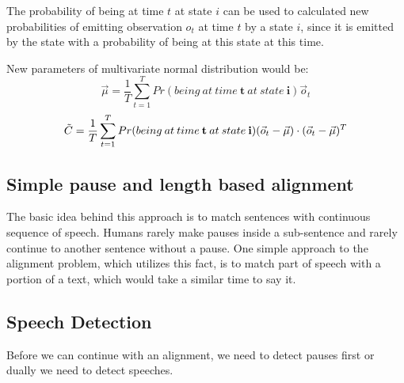 \documentclass[12pt,a4paper,english]{article}
\begin{document}
The probability of being at time $t$ at state $i$ can be used to calculated new probabilities of emitting observation $o_t$ at time $t$ by a state $i$,
since it is emitted by the state with a probability of being at this state at this time. \newline

New parameters of multivariate normal distribution would be:
\begin{equation}
    \vec \mu = \frac 1 T \sum_{t=1}^{T} Pr(being \: at \: time \: \boldsymbol{t} \: at \: state \: \boldsymbol{i}) \vec o_t
\end{equation}
\begin{equation}
    \tilde C = \frac 1 T \sum_{t=1}^{T} Pr(being \: at \: time \: \bold{t} \: at \: state \: \bold{i})(\vec o_t - \vec \mu) \cdot (\vec o_t - \vec \mu)^T
\end{equation}


\newpage
\begin{center}
    \section{Simple pause and length based alignment}
\end {center}
\setcounter{equation}{0}

The basic idea behind this approach is to match sentences with continuous sequence of speech.
Humans rarely make pauses inside a sub-sentence and rarely continue to another sentence without a pause. \newline
One simple approach to the alignment problem, which utilizes this fact, is to match part of speech with a portion of a text,
which would take a similar time to say it. \newline \newline

\subsection{Speech Detection}

Before we can continue with an alignment, we need to detect pauses first or dually we need to detect speeches. \newline
\end{document}
